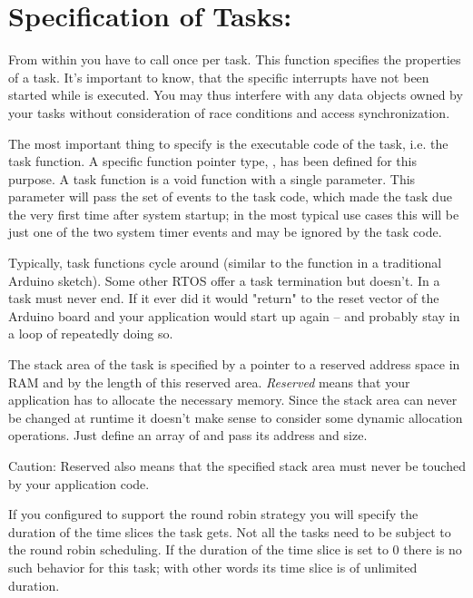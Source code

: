 \section{Specification of Tasks: }

From within  you have to call 
once per task. This function specifies the properties of a task. It's
important to know, that the specific \rtos{} interrupts have not been
started while  is executed. You may thus interfere with any
data objects owned by your tasks without consideration of race conditions
and access synchronization.

The most important thing to specify is the executable code of the task,
i.e. the task function. A specific function pointer type,
, has been defined for this purpose. A
task function is a void function with a single parameter. This parameter
will pass the set of events to the task code, which made the task due the
very first time after system startup; in the most typical use cases this
will be just one of the two system timer events and may be ignored by the
task code.

Typically, task functions cycle around (similar to the function
 in a traditional Arduino sketch). Some other RTOS offer a
task termination but \rtos{} doesn't. In \rtos{} a task must never end. If
it ever did it would "return" to the reset vector of the Arduino board and
your application would start up again -- and probably stay in a loop of
repeatedly doing so.

The stack area of the task is specified by a pointer to a reserved address
space in RAM and by the length of this reserved area. \emph{Reserved} means
that your application has to allocate the necessary memory. Since the
stack area can never be changed at runtime it doesn't make sense to
consider some dynamic allocation operations. Just define an array of
 and pass its address and size.

Caution: Reserved also means that the specified stack area must never be
touched by your application code.

If you configured \rtos{} to support the round robin strategy you will
specify the duration of the time slices the task gets. Not all the tasks
need to be subject to the round robin scheduling. If the duration of the
time slice is set to 0 there is no such behavior for this task; with other
words its time slice is of unlimited duration.

